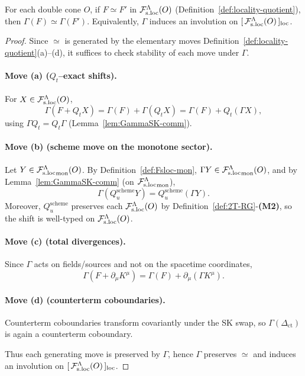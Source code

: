 \begin{lemma}
\label{lem:Gamma-preserves-quotient}
For each double cone $O$, if $F\simeq F'$ in $\mathcal F_{\mathrm{s.loc}}^\Lambda(O)$
(Definition~\ref{def:locality-quotient}), then $\Gamma(F)\simeq \Gamma(F')$.
Equivalently, $\Gamma$ induces an involution on $[\,\mathcal F_{\mathrm{s.loc}}^\Lambda(O)\,]_{\mathrm{loc}}$.
\end{lemma}

\begin{proof}
Since $\simeq$ is generated by the elementary moves
Definition~\ref{def:locality-quotient}\textnormal{(a)}--\textnormal{(d)}, it
suffices to check stability of each move under $\Gamma$.

\paragraph{Move \textnormal{(a)} ($Q_t$--exact shifts).}
For $X\in\mathcal F_{\mathrm{s.loc}}^\Lambda(O)$,
\[
\Gamma(F+Q_tX)=\Gamma(F)+\Gamma(Q_tX)=\Gamma(F)+Q_t(\Gamma X),
\]
using $\Gamma Q_t=Q_t\Gamma$ (Lemma~\ref{lem:GammaSK-comm}).

\paragraph{Move \textnormal{(b)} (scheme move on the monotone sector).}
Let $Y\in{\mathcal F_{\mathrm{s.loc}}^\Lambda}_{\mathrm{mon}}(O)$.  By Definition~\ref{def:Fsloc-mon},
$\Gamma Y\in{\mathcal F_{\mathrm{s.loc}}^\Lambda}_{\mathrm{mon}}(O)$, and by Lemma~\ref{lem:GammaSK-comm} (on
${\mathcal F_{\mathrm{s.loc}}^\Lambda}_{\mathrm{mon}}$),
\[
\Gamma(Q_u^{\mathrm{scheme}}Y)=Q_u^{\mathrm{scheme}}(\Gamma Y).
\]
Moreover, $Q_u^{\mathrm{scheme}}$ preserves each $\mathcal F_{\mathrm{s.loc}}^\Lambda(O)$ by
Definition~\ref{def:2T-RG}-\textbf{(M2)}, so the shift is well-typed on $\mathcal F_{\mathrm{s.loc}}^\Lambda(O)$.

\paragraph{Move \textnormal{(c)} (total divergences).}
Since $\Gamma$ acts on fields/sources and not on the spacetime coordinates,
\[
\Gamma(F+\partial_\mu K^\mu)=\Gamma(F)+\partial_\mu(\Gamma K^\mu).
\]

\paragraph{Move \textnormal{(d)} (counterterm coboundaries).}
Counterterm coboundaries transform covariantly under the SK swap, so
$\Gamma(\Delta_{\mathrm{ct}})$ is again a counterterm coboundary.

Thus each generating move is preserved by $\Gamma$, hence $\Gamma$ preserves
$\simeq$ and induces an involution on $[\,\mathcal F_{\mathrm{s.loc}}^\Lambda(O)\,]_{\mathrm{loc}}$.
\end{proof}

